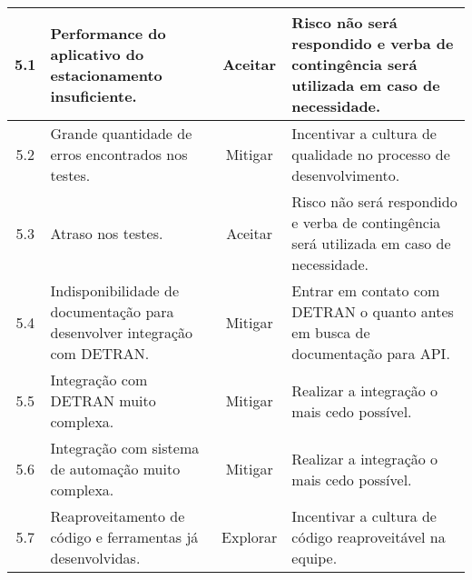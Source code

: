 \begin{longtable}{ c p{} c p{} }
	\midrule
	5.1                      & Performance do aplicativo do estacionamento insuficiente.                                                                                                                     & Aceitar                    & Risco não será respondido e verba de contingência será utilizada em caso de necessidade.                                           \\
	\midrule
	5.2                      & Grande quantidade de erros encontrados nos testes.                                                                                                                            & Mitigar                    & Incentivar a cultura de qualidade no processo de desenvolvimento.                                                                      \\
	\midrule
	5.3                      & Atraso nos testes.                                                                                                                                                            & Aceitar                    & Risco não será respondido e verba de contingência será utilizada em caso de necessidade.                                           \\
	\midrule
	5.4                      & Indisponibilidade de documentação para desenvolver integração com DETRAN.                                                                                                 & Mitigar                    & Entrar em contato com DETRAN o quanto antes em busca de documentação para API.                                                       \\
	\midrule
	5.5                      & Integração com DETRAN muito complexa.                                                                                                                                       & Mitigar                    & Realizar a integração o mais cedo possível.                                                                                         \\
	\midrule
	5.6                      & Integração com sistema de automação muito complexa.                                                                                                                       & Mitigar                    & Realizar a integração o mais cedo possível.                                                                                         \\
	\midrule
	5.7                      & Reaproveitamento de código e ferramentas já desenvolvidas.                                                                                                                  & Explorar                   & Incentivar a cultura de código reaproveitável na equipe.                                                                             \\

\end{longtable}

